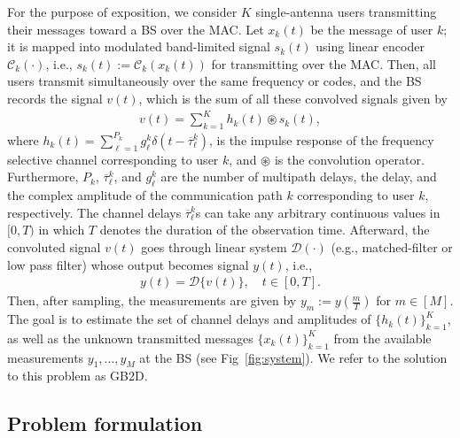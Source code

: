 \documentclass[conference,10pt]{IEEEtran}
\theoremstyle{remark}
\theoremstyle{plain}
\theoremstyle{definition}
\theoremstyle{remark}
\begin{document}
For the purpose of exposition, we consider $K$ single-antenna users transmitting their messages toward a \ac{BS} over the \ac{MAC}.  Let  $x_k(t)$ be the message of user $k$; it is mapped into modulated band-limited signal $s_k(t)$ using linear encoder $\mathcal{C}_k(\cdot)$, i.e., $s_k(t):= \mathcal{C}_k(x_k(t))$ for transmitting over the \ac{MAC}. Then, all users transmit simultaneously over the same frequency or codes, and the \ac{BS} records the signal $v(t)$, which is the sum of all these convolved signals given by 
\begin{align}\label{eq:mymodel}
v(t)=\sum_{k=1}^{K}h_k(t)\circledast s_k(t),
\end{align}
where $h_k(t)=\sum_{\ell=1}^{P_k}g_{\ell}^k\delta(t-\overline{\tau}_{\ell}^k)$, is the impulse response of the frequency selective channel corresponding to user $k$, and $\circledast$ is the convolution operator. Furthermore, $P_k$, $\overline{\tau}_{\ell}^k$, and $g_{\ell}^k$ are the number of multipath delays, the delay, and the complex amplitude of the communication path $k$ corresponding to user $k$, respectively. The channel delays $\overline{\tau}_{\ell}^k$s can take any arbitrary continuous values in $[0, T)$ in which $T$ denotes the duration of the observation time.  Afterward, the convoluted signal $v(t)$ goes through linear system $\mathcal{D}(\cdot)$ (e.g., matched-filter or low pass filter) whose output becomes signal $y(t)$, i.e.,  
     \begin{align}\label{eq:measure}
     y(t) = \mathcal{D}\{v(t)\},  \quad t \in [0,T].
     \end{align}      
Then, after sampling, the measurements are given by $y_m:= y(\frac{m}{T})$ for $m\in [M]$. The goal is to estimate the set of channel delays and amplitudes of $\{h_k(t)\}_{k=1}^K$, as well as the unknown transmitted messages $\{x_k(t)\}_{k=1}^K$ from the available measurements  $y_1, \ldots, y_M$ at the \ac{BS} (see Fig~\ref{fig:system}). We refer to the solution to this problem as \ac{GB2D}.

\subsection{Problem formulation}
\end{document}

